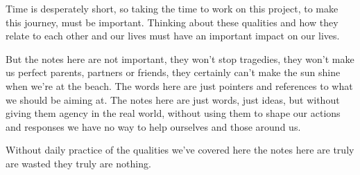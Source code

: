 \cleardoublepage
{ \small

Time is desperately short, so taking the time to work on this project, to make this journey, must be important. Thinking about these qualities and how they relate to each other and our lives must have an important impact on our lives. 

But the notes here are not important, they won't stop tragedies, they won't make us perfect parents, partners or friends, they certainly can't make the sun shine when we're at the beach. The words here are just pointers and references to what we should be aiming at. The notes here are just words, just ideas, but without giving them agency in the real world, without using them to shape our actions and responses we have no way to help ourselves and those around us. 

Without daily practice of the qualities we've covered here the notes here are truly are wasted they truly are nothing. 


}